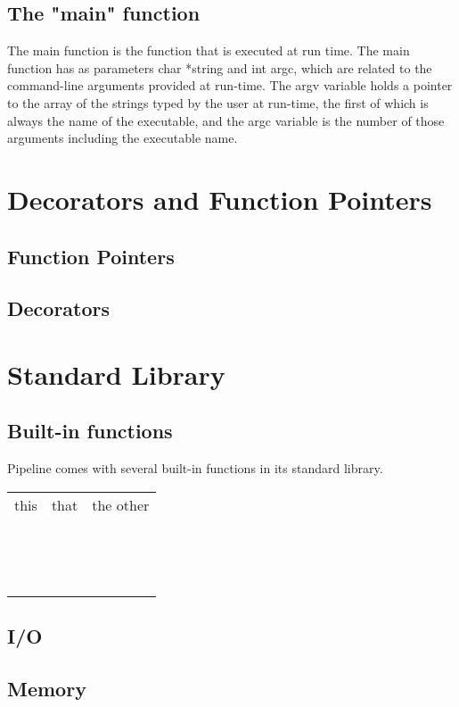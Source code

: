 \documentclass[./LRM_main.tex]{subfiles}
\begin{document}
\subsection{The "main" function}
The main function is the function that is executed at run time. The main function has as parameters char *string and int argc, which are related to the command-line arguments provided at run-time. The argv variable holds a pointer to the array of the strings typed by the user at run-time, the first of which is always the name of the executable, and the argc variable is the number of those arguments including the executable name.
\section{Decorators and Function Pointers}
\subsection{Function Pointers}
\subsection{Decorators}
\section{Standard Library}
\subsection{Built-in functions}
Pipeline comes with several built-in functions in its standard library. 
\begin{table}
    \begin{tabular}{lll}
    this & that & the other \\
    ~ & ~ & ~ \\
    ~ & ~ & ~ \\
    ~ & ~ & ~ \\
    \end{tabular}
\end{table}

\begin{comment}
sizeof
sprintf
strlen
strcompare
substring
strlen
sprintf
\end{comment}
\subsection{I/O}
\begin{comment}
printf
formatting
verbs
user input
\end{comment}
\subsection{Memory}


\end{document}
